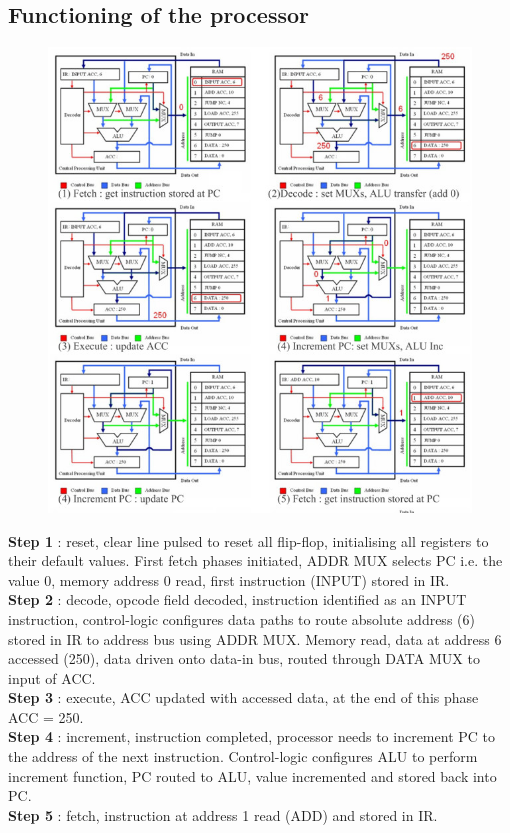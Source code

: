\documentclass[11pt]{article}
\begin{document}
\subsection{Functioning of the processor}
\begin{figure}[H]
  \begin{center}
    \includegraphics[scale=0.5]{steps_1_to_5_tmb.jpg}
  \end{center}
\end{figure}

\textbf{ Step 1} : reset, clear line pulsed to reset all flip-flop, initialising all registers to their default values. First fetch phases initiated, ADDR MUX selects PC i.e. the value 0, memory address 0 read, first instruction (INPUT) stored in IR. \\
\textbf{Step 2} : decode, opcode field decoded, instruction identified as an INPUT instruction, control-logic configures data paths to route absolute address (6) stored in IR to address bus using ADDR MUX. Memory read, data at address 6 accessed (250), data driven onto data-in bus, routed through DATA MUX to input of ACC.\\
\textbf{Step 3} : execute, ACC updated with accessed data, at the end of this phase ACC = 250. \\
\textbf{Step 4} : increment, instruction completed, processor needs to increment PC to the address of the next instruction. Control-logic configures ALU to perform increment function, PC routed to ALU, value incremented and stored back into PC. \\ 
\textbf{Step 5} : fetch, instruction at address 1 read (ADD) and stored in IR. \\
\end{document}
